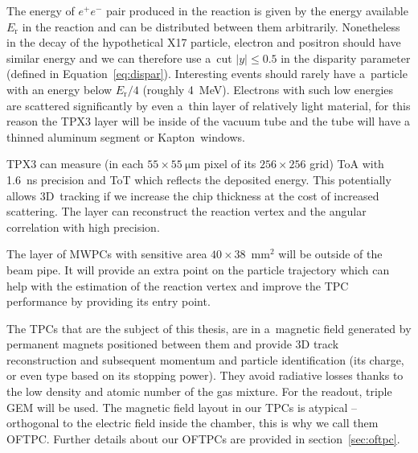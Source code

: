 		The energy of $e^+e^-$ pair produced in the reaction is given by the energy available $E_\text{r}$ in the reaction and can be distributed between them arbitrarily. Nonetheless in the decay of the hypothetical X17 particle, electron and positron should have similar energy and we can therefore use a~cut $|y| \leq 0.5$ in the disparity parameter (defined in Equation~\ref{eq:dispar}). Interesting events should rarely have a~particle with an energy below $E_\text{r}/4$ (roughly 4~MeV). Electrons with such low energies are scattered significantly by even a~thin layer of relatively light material, for this reason the \ac{TPX3} layer will be inside of the vacuum tube and the tube will have a thinned aluminum segment or Kapton\texttrademark\ windows.
		
		\ac{TPX3} can measure (in each $55\times55~\mathrm{\mu m}$ pixel of its $256\times256$ grid) \ac{ToA} with 1.6~ns precision and \ac{ToT} which reflects the deposited energy. This potentially allows 3D~tracking if we increase the chip thickness at the cost of increased scattering. The layer can reconstruct the reaction vertex and the angular correlation with high precision.
		
		The layer of \acp{MWPC} with sensitive area $40\times38$~mm$^2$ will be outside of the beam pipe. It will provide an extra point on the particle trajectory which can help with the estimation of the reaction vertex and improve the \ac{TPC} performance by providing its entry point.
		
		The \acp{TPC} that are the subject of this thesis, are in a~magnetic field generated by permanent magnets positioned between them and provide 3D track reconstruction and subsequent momentum and particle identification (its charge, or even type based on its stopping power). They avoid radiative losses thanks to the low density and atomic number of the gas mixture. For the readout, triple \ac{GEM} will be used. The magnetic field layout in our \acp{TPC} is atypical -- orthogonal to the electric field inside the chamber, this is why we call them \acf{OFTPC}. Further details about our \acp{OFTPC} are provided in section~\ref{sec:oftpc}.